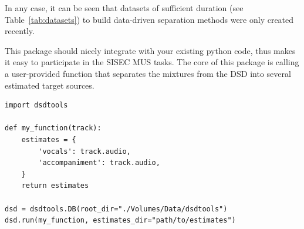 In any case, it can be seen that datasets of sufficient duration (see Table~\ref{tab:datasets}) to build data-driven separation methods were only created recently.

This package should nicely integrate with your existing python code, thus makes it easy to participate in the SISEC MUS tasks. The core of this package is calling a user-provided function that separates the mixtures from the DSD into several estimated target sources.

\begin{verbatim}
import dsdtools

def my_function(track):
    estimates = {
        'vocals': track.audio,
        'accompaniment': track.audio,
    }
    return estimates

dsd = dsdtools.DB(root_dir="./Volumes/Data/dsdtools")
dsd.run(my_function, estimates_dir="path/to/estimates")
\end{verbatim}

